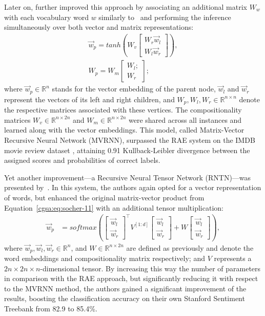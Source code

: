Later on, \citet{Socher:12} further improved this approach by
associating an additional matrix $W_w$ with each vocabulary word $w$
similarly to~\citet{Yessenalina:10} and performing the inference
simultaneously over both vector and matrix representations:
\begin{align*}
  \vec{w}_p = tanh\left(W_v \begin{bmatrix}W_r\vec{w}_l\\
      W_l \vec{w}_r\end{bmatrix} \right),\\
  W_p = W_m \begin{bmatrix}W_l;\\
    W_r\end{bmatrix};
\end{align*}
where $\vec{w}_p\in\mathbb{R}^n$ stands for the vector embedding of
the parent node, $\vec{w}_l$ and $\vec{w}_r$ represent the vectors of
its left and right children, and $W_p, W_l, W_r \in
\mathbb{R}^{n\times n}$ denote the respective matrices associated with
these vertices.  The compositionality matrices
$W_v\in\mathbb{R}^{n\times 2n}$ and $W_m\in\mathbb{R}^{n\times 2n}$
were shared across all instances and learned along with the vector
embeddings.  This model, called Matrix-Vector Recursive Neural Network
(MVRNN), surpassed the RAE system on the IMDB movie review dataset
\cite{Pang:05}, attaining 0.91 Kullback-Leibler divergence between the
assigned scores and probabilities of correct labels.

Yet another improvement---a Recursive Neural Tensor Network
(RNTN)---was presented by~\citet{Socher:13}.  In this system, the
authors again opted for a vector representation of words, but enhanced
the original matrix-vector product from
Equation~\ref{cgsa:eq:socher-11} with an additional tensor
multiplication:
\begin{align*}
  \vec{w}_p &= softmax\left(\begin{bmatrix}
  \vec{w}_l\\
  \vec{w}_r
  \end{bmatrix}^{\top}V^{[1:d]}\begin{bmatrix}
  \vec{w}_l\\
  \vec{w}_r
  \end{bmatrix}
            + W\begin{bmatrix}
  \vec{w}_l\\
  \vec{w}_r
\end{bmatrix}\right),\label{cgsa:eq:socher-13}
\end{align*}
where $\vec{w}_p, \vec{w}_l, \vec{w}_r\in\mathbb{R}^n$, and
$W\in\mathbb{R}^{n\times 2n}$ are defined as previously and denote the
word embeddings and compositionality matrix respectively; and $V$
represents a $2n\times 2n\times n$-dimensional tensor.  By increasing
this way the number of parameters in comparison with the RAE approach,
but significantly reducing it with respect to the MVRNN method, the
authors gained a significant improvement of the results, boosting the
classification accuracy on their own Stanford Sentiment Treebank from
82.9 to 85.4\%.

